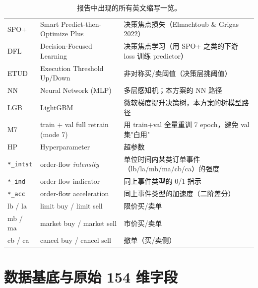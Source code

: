 \documentclass[10.5pt,a4paper]{article}
\begin{document}
\begin{table}[H]
\begin{tabularx}{\linewidth}{l l >{\raggedright\arraybackslash}X}
SPO+    & Smart Predict-then-Optimize Plus          & 决策焦点损失（Elmachtoub \& Grigas 2022） \\
DFL     & Decision-Focused Learning                 & 决策焦点学习（用 SPO+ 之类的下游 loss 训练 predictor） \\
ETUD    & Execution Threshold Up/Down               & 非对称买/卖阈值（决策层挑阈值） \\
NN      & Neural Network (MLP)                      & 多层感知机；本方案的 NN 路径 \\
LGB     & LightGBM                                  & 微软梯度提升决策树，本方案的树模型路径 \\
M7      & train + val full retrain (mode 7)         & 用 train+val 全量重训 7 epoch，避免 val 集"白用" \\
HP      & Hyperparameter                            & 超参数 \\
\texttt{*\_intst} & order-flow \emph{intensity}     & 单位时间内某类订单事件（lb/la/mb/ma/cb/ca）的强度 \\
\texttt{*\_ind} & order-flow indicator              & 同上事件类型的 0/1 指示 \\
\texttt{*\_acc} & order-flow acceleration           & 同上事件类型的加速度（二阶差分） \\
lb / la & limit buy / limit sell                    & 限价买/卖单 \\
mb / ma & market buy / market sell                  & 市价买/卖单 \\
cb / ca & cancel buy / cancel sell                  & 撤单（买/卖侧） \\
\bottomrule
\end{tabularx}
\caption{报告中出现的所有英文缩写一览。}
\label{tab:glossary}
\end{table}

\section{数据基底与原始 154 维字段}
\end{document}
